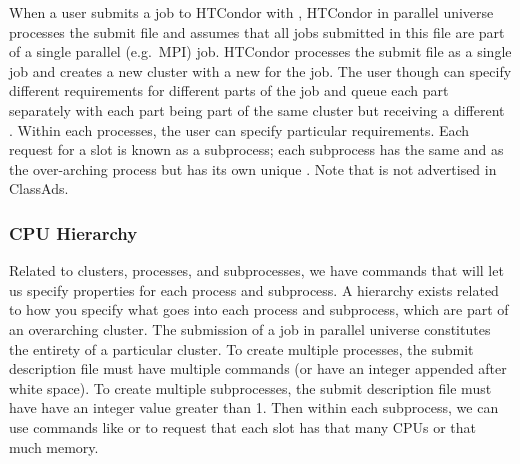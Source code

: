 When 
a user submits a job to HTCondor with , HTCondor in parallel 
universe processes the submit file and assumes that all jobs submitted in this 
file are part of a single parallel (e.g.~MPI) job. HTCondor processes the submit 
file as a single job and
creates a new cluster with a new  for the job. The user though can 
specify different requirements for different parts of the job and queue each 
part separately with each part being part of the same cluster but receiving a 
different . Within each processes, the user can specify particular
requirements.
Each request for a slot is known as a subprocess; each subprocess has the same 
 and  as the over-arching process but has its 
own unique 
. Note that  is not advertised in ClassAds.



\subsubsection{CPU Hierarchy}



Related to clusters, processes, and subprocesses, we have commands that will 
let us specify properties for each process and subprocess. A hierarchy exists 
related to how you specify what goes into each process and subprocess, which are
part of an overarching cluster. The submission of a job in parallel universe 
constitutes the entirety of a particular cluster. To create multiple processes,
the submit description file must have multiple  commands (or have
an integer appended after white space). To create multiple subprocesses, the 
submit description file must have  have an integer
value greater than 1. Then within each subprocess, we can use commands like
 or  to request that each 
slot has that many CPUs or that much memory.

